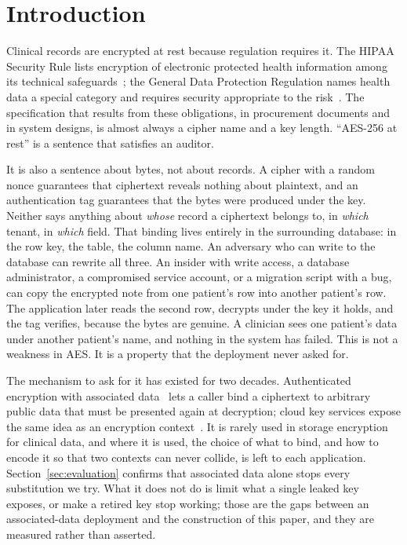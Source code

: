 \section{Introduction}
\label{sec:intro}

Clinical records are encrypted at rest because regulation requires it. The HIPAA Security Rule lists encryption of electronic protected health information among its technical safeguards~\cite{hipaa-security-rule}; the General Data Protection Regulation names health data a special category and requires security appropriate to the risk~\cite{gdpr}. The specification that results from these obligations, in procurement documents and in system designs, is almost always a cipher name and a key length. ``AES-256 at rest'' is a sentence that satisfies an auditor.

It is also a sentence about bytes, not about records. A cipher with a random nonce guarantees that ciphertext reveals nothing about plaintext, and an authentication tag guarantees that the bytes were produced under the key. Neither says anything about \emph{whose} record a ciphertext belongs to, in \emph{which} tenant, in \emph{which} field. That binding lives entirely in the surrounding database: in the row key, the table, the column name. An adversary who can write to the database can rewrite all three. An insider with write access, a database administrator, a compromised service account, or a migration script with a bug, can copy the encrypted note from one patient's row into another patient's row. The application later reads the second row, decrypts under the key it holds, and the tag verifies, because the bytes are genuine. A clinician sees one patient's data under another patient's name, and nothing in the system has failed. This is not a weakness in AES. It is a property that the deployment never asked for.

The mechanism to ask for it has existed for two decades. Authenticated encryption with associated data~\cite{rogaway2002aead} lets a caller bind a ciphertext to arbitrary public data that must be presented again at decryption; cloud key services expose the same idea as an encryption context~\cite{aws-kms-context}. It is rarely used in storage encryption for clinical data, and where it is used, the choice of what to bind, and how to encode it so that two contexts can never collide, is left to each application. Section~\ref{sec:evaluation} confirms that associated data alone stops every substitution we try. What it does not do is limit what a single leaked key exposes, or make a retired key stop working; those are the gaps between an associated-data deployment and the construction of this paper, and they are measured rather than asserted.

